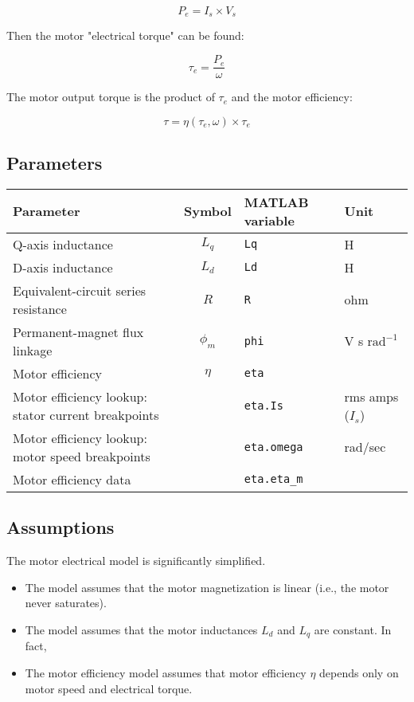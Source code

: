 \documentclass[../SimBALink.tex]{subfiles}
\begin{document}
		\begin{equation}
			P_e = I_s \times V_s
		\end{equation}
		
		Then the motor "electrical torque" can be found:
		
		\begin{equation}
			\tau_e = \frac{P_e}{\omega}
		\end{equation}
		
		The motor output torque is the product of $\tau_e$ and the motor efficiency:
		
		\begin{equation}
			\tau	=	\eta(\tau_e, \omega) \times \tau_e
		\end{equation}

\subsection{Parameters}
	
	\renewcommand{\arraystretch}{1.5}
	\begin{tabular}{ p{5cm} | c | l | l }
		Parameter					&	Symbol				&	MATLAB variable	&	Unit						\\\hline	
		Q-axis inductance				&	$L_q$				&	\texttt{Lq}			&	H			\\
		D-axis inductance				&	$L_d$				&	\texttt{Ld}			&	H			\\
		Equivalent-circuit series resistance	&	$R$					&	\texttt{R}			&	ohm			\\
		Permanent-magnet flux linkage	&	$\phi_m$				&	\texttt{phi}		&	V s $\text{rad}^{-1}$	\\
		Motor efficiency				&	$\eta$				&	\texttt{eta}		&				\\
		Motor efficiency lookup: stator current breakpoints	&			&	\texttt{eta.Is}		&	rms amps ($I_s$)	\\
		Motor efficiency lookup: motor speed breakpoints	&			&	\texttt{eta.omega}	& 	rad/sec		\\
		Motor efficiency data			&						&	\texttt{eta.eta\_m}	&	
	\end{tabular}


\subsection{Assumptions}
	The motor electrical model is significantly simplified.
	\begin{itemize}
		\item 
			The model assumes that the motor magnetization is linear (i.e., the motor never saturates).
		\item
			The model assumes that the motor inductances $L_d$ and $L_q$ are constant. In fact, 
		\item
			The motor efficiency model assumes that motor efficiency $\eta$ depends only on motor speed and electrical torque.
	\end{itemize}



\end{document}
